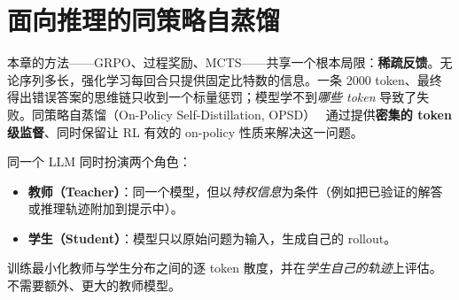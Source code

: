 \section{面向推理的同策略自蒸馏}
\label{sec:on-policy-self-distillation}

本章的方法——GRPO、过程奖励、MCTS——共享一个根本局限：\textbf{稀疏反馈}。无论序列多长，强化学习每回合只提供固定比特数的信息。一条 2000 token、最终得出错误答案的思维链只收到一个标量惩罚；模型学不到\emph{哪些 token} 导致了失败。同策略自蒸馏（On-Policy Self-Distillation, OPSD）~\cite{zhao2026opsd} 通过提供\textbf{密集的 token 级监督}、同时保留让 RL 有效的 on-policy 性质来解决这一问题。

\begin{keybox}
同一个 LLM 同时扮演两个角色：
\begin{itemize}
  \item \textbf{教师（Teacher）}：同一个模型，但以\emph{特权信息}为条件（例如把已验证的解答或推理轨迹附加到提示中）。
  \item \textbf{学生（Student）}：模型只以原始问题为输入，生成自己的 rollout。
\end{itemize}
训练最小化教师与学生分布之间的逐 token 散度，并在\emph{学生自己的轨迹}上评估。不需要额外、更大的教师模型。
\end{keybox}

